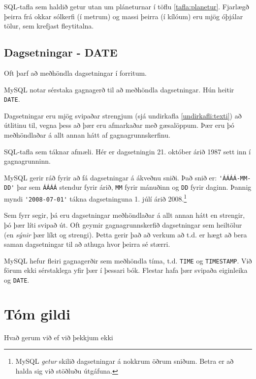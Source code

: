 \begin{example}
\caption[Plánetur]{SQL-tafla sem haldið getur utan um pláneturnar í töflu \ref{tafla:planetur}. Fjarlægð þeirra frá okkar sólkerfi (í metrum) og massi þeirra (í kílóum) eru mjög óþjálar tölur, sem krefjast fleytitalna.}
\label{sql:k3d7-planetur}
\centering
{}
\end{example}

\subsection{Dagsetningar - DATE}
Oft þarf að meðhöndla dagsetningar í forritum.

MySQL notar sérstaka gagnagerð til að meðhöndla dagsetningar. Hún heitir \verb|DATE|.

Dagsetningar eru mjög svipaðar strengjum (sjá undirkafla \ref{undirkafli:texti}) að útlitinu til, vegna þess að þær eru afmarkaðar með gæsalöppum. Þær eru þó meðhöndlaðar á allt annan hátt af gagnagrunnskerfinu.

\begin{example}
\caption[Afmælisdagar]{SQL-tafla sem táknar afmæli. Hér er dagsetningin 21. október árið 1987 sett inn í gagnagrunninn.}
\label{sql:k3d14-afmaeli}
\centering
{}
\end{example}

MySQL gerir ráð fyrir að fá dagsetningar á ákveðnu sniði. Það snið er: \verb|'ÁÁÁÁ-MM-DD'| þar sem \verb|ÁÁÁÁ| stendur fyrir árið, \verb|MM| fyrir mánuðinn og \verb|DD| fyrir daginn. Þannig myndi \verb|'2008-07-01'| tákna dagsetninguna 1. júlí árið 2008.\footnote{MySQL \emph{getur} skilið dagsetningar á nokkrum öðrum sniðum. Betra er að halda sig við stöðluðu útgáfuna.}

Sem fyrr segir, þá eru dagsetningar meðhöndlaðar á allt annan hátt en strengir, þó þær líti svipað út. Oft geymir gagnagrunnskerfið dagsetningar sem heiltölur (en \emph{sýnir} þær líkt og strengi). Þetta gerir það að verkum að t.d. er hægt að bera saman dagsetningar til að athuga hvor þeirra sé stærri.

MySQL hefur fleiri gagnagerðir sem meðhöndla tíma, t.d. \verb|TIME| og \verb|TIMESTAMP|. Við förum ekki sérstaklega yfir þær í þessari bók. Flestar hafa þær svipaða eiginleika og \verb|DATE|.

\section{Tóm gildi} %
Hvað gerum við ef við þekkjum ekki 

